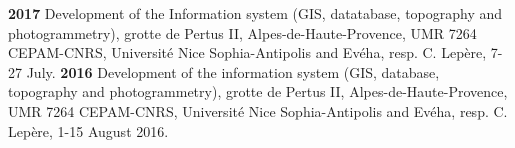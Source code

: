 \textbf{2017 }Development of the Information system (GIS, datatabase, topography and photogrammetry), grotte de Pertus II, Alpes-de-Haute-Provence, UMR 7264 CEPAM-CNRS, Universit\'{e} Nice Sophia-Antipolis and Ev\'{e}ha, resp. C. Lep\`{e}re, 7-27 July.
\smallbreak
\textbf{2016 }Development of the information system (GIS, database, topography and photogrammetry), grotte de Pertus II, Alpes-de-Haute-Provence, UMR 7264 CEPAM-CNRS, Universit\'{e} Nice Sophia-Antipolis and Ev\'{e}ha, resp. C. Lep\`{e}re, 1-15 August 2016.
\smallbreak
